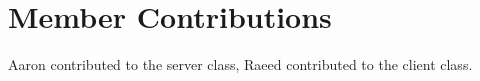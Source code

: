 \section*{Member Contributions}
Aaron contributed to the server class, Raeed contributed to the client class.
